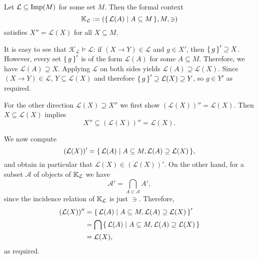 \begin{Proposition}
  \label{prop:context-model-for-implications}
  Let $\mathcal{L} \subseteq \operatorname{Imp}(M)$ for some set $M$.  Then the formal context
  \begin{equation*}
    {\ensuremath{\mathbb{K}}}_{\mathcal{L}} := ( {\{\, \mathcal{L}(A) \mid A \subseteq M \,\}}, M, \ni )
  \end{equation*}
  satisfies $X'' = \mathcal{L}(X)$ for all $X \subseteq M$.
\end{Proposition}
\begin{Proof}
  It is easy to see that $\mathcal{K}_{\mathcal{L}} \models \mathcal{L}$: if $(X \to Y)
  \in \mathcal{L}$ and $g \in X'$, then ${\{\,g\,\}}' \supseteq X$.  However, every set
  ${\{\,g\,\}}'$ is of the form $\mathcal{L}(A)$ for some $A \subseteq M$.  Therefore, we have
  $\mathcal{L}(A) \supseteq X$.  Applying $\mathcal{L}$ on both sides yields
  $\mathcal{L}(A) \supseteq \mathcal{L}(X)$.  Since $(X \to Y) \in \mathcal{L}$, $Y
  \subseteq \mathcal{L}(X)$ and therefore ${\{\,g\,\}}' \supseteq \mathcal{L}(X) \supseteq Y$,
  so $g \in Y'$ as required.

  For the other direction $\mathcal{L}(X) \supseteq X''$ we first show $(\mathcal{L}(X))''
  = \mathcal{L}(X)$.  Then $X \subseteq \mathcal{L}(X)$ implies
  \begin{equation*}
    X'' \subseteq (\mathcal{L}(X))'' = \mathcal{L}(X).
  \end{equation*}

  We now compute
  \begin{equation*}
    (\mathcal{L}(X))' = {\{\, \mathcal{L}(A) \mid A \subseteq M, \mathcal{L}(A) \supseteq
      \mathcal{L}(X) \,\}},
  \end{equation*}
  and obtain in particular that $\mathcal{L}(X) \in (\mathcal{L}(X))'$.  On the other
  hand, for a subset $\mathcal{A}$ of objects of ${\mathbb{K}}_{\mathcal{L}}$ we have
  \begin{equation*}
    \mathcal{A}' = \bigcap_{A \in \mathcal{A}} A',
  \end{equation*}
  since the incidence relation of ${\mathbb{K}}_{\mathcal{L}}$ is just $\ni$.  Therefore,
  \begin{align*}
    (\mathcal{L}(X))'' &= {\{\, \mathcal{L}(A) \mid A \subseteq M, \mathcal{L}(A)
      \supseteq \mathcal{L}(X) \,\}}' \\
    &= \bigcap {\ensuremath{\{\, \mathcal{L}(A) \mid A \subseteq M, \mathcal{L}(A) \supseteq
      \mathcal{L}(X) \,\}}} \\
    &= \mathcal{L}(X),
  \end{align*}
  as required.
\end{Proof}

